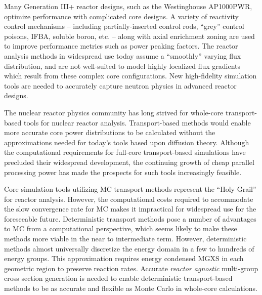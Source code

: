 Many Generation III+ reactor designs, such as the Westinghouse AP1000\texttrademark \ac{PWR}, optimize performance with complicated core designs. A variety of reactivity control mechanisms -- including partially-inserted control rods, ``grey'' control poisons, \ac{IFBA}, soluble boron, etc. -- along with axial enrichment zoning are used to improve performance metrics such as power peaking factors. The reactor analysis methods in widespread use today assume a ``smoothly'' varying flux distribution, and are not well-suited to model highly localized flux gradients which result from these complex core configurations. New high-fidelity simulation tools are needed to accurately capture neutron physics in advanced reactor designs.


The nuclear reactor physics community has long strived for whole-core transport-based tools for nuclear reactor analysis. Transport-based methods would enable more accurate core power distributions to be calculated without the approximations needed for today’s tools based upon diffusion theory. Although the computational requirements for full-core transport-based simulations have precluded their widespread development, the continuing growth of cheap parallel processing power has made the prospects for such tools increasingly feasible.


Core simulation tools utilizing \ac{MC} transport methods represent the ``Holy Grail'' for reactor analysis. However, the computational costs required to accommodate the slow convergence rate for \ac{MC} makes it impractical for widespread use for the foreseeable future. Deterministic transport methods pose a number of advantages to \ac{MC} from a computational perspective, which seems likely to make these methods more viable in the near to intermediate term. However, deterministic methods almost universally discretize the energy domain in a few to hundreds of energy groups. This approximation requires energy condensed \ac{MGXS} in each geometric region to preserve reaction rates. Accurate \emph{reactor agnostic} multi-group cross section generation is needed to enable deterministic transport-based methods to be as accurate and flexible as Monte Carlo in whole-core calculations.

